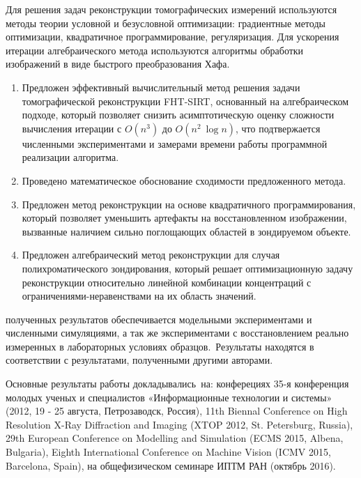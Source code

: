 {\methods}
Для решения задач реконструкции томографических измерений используются методы теории условной и безусловной оптимизации: градиентные методы оптимизации, квадратичное программирование, регуляризация.
Для ускорения итерации алгебраического метода используются алгоритмы обработки изображений в виде быстрого преобразования Хафа.


{}
\begin{enumerate}
  \item Предложен эффективный вычислительный метод решения задачи томографической реконструкции FHT-SIRT, основанный на алгебраическом подходе, который позволяет снизить асимптотическую оценку сложности вычисления итерации с $O(n^3)$ до $O(n^2~\log n)$, что подтвержается численными экспериментами и замерами времени работы программной реализации алгоритма.
  \item Проведено математическое обоснование сходимости предложенного метода.
  \item Предложен метод реконструкции на основе квадратичного программирования, который позволяет уменьшить артефакты на восстановленном изображении, вызванные наличием сильно поглощающих областей в зондируемом объекте.
  \item Предложен алгебраический метод реконструкции для случая полихроматического зондирования, который решает оптимизационную задачу реконструкции относительно линейной комбинации концентраций с ограничениями-неравенствами на их область значений.
\end{enumerate}


{\reliability} полученных результатов обеспечивается модельными экспериментами и численными симуляциями, а так же экспериментами с восстановлением реально измеренных в лабораторных условиях образцов.\ Результаты находятся в соответствии с результатами, полученными другими авторами.


{\probation}
Основные результаты работы докладывались~на: конферециях 
35-я конференция молодых ученых и специалистов «Информационные технологии и системы» (2012, 19 - 25 августа, Петрозаводск, Россия),
11th Biennal Conference on High Resolution X-Ray Diffraction and Imaging (XTOP 2012, St. Petersburg, Russia), 
29th European Conference on Modelling and Simulation (ECMS 2015, Albena, Bulgaria),
Eighth International Conference on Machine Vision (ICMV 2015, Barcelona, Spain),
на общефизическом семинаре ИПТМ РАН (октябрь 2016).

